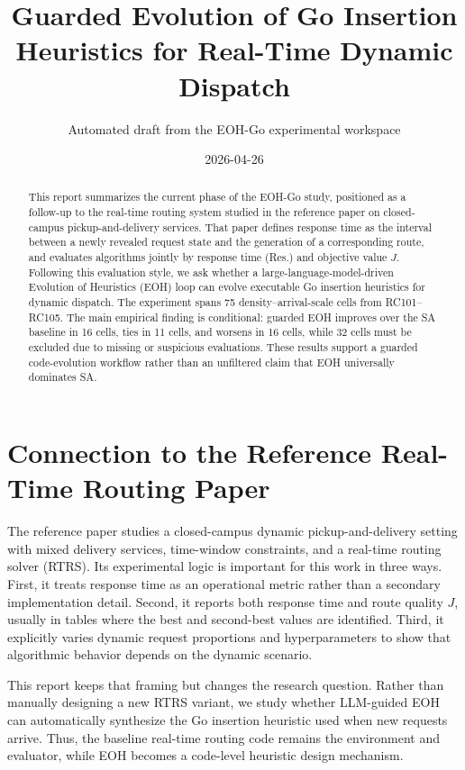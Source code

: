 \documentclass[11pt]{article}
\title{Guarded Evolution of Go Insertion Heuristics for Real-Time Dynamic Dispatch}
\author{Automated draft from the EOH-Go experimental workspace}
\date{2026-04-26}
\begin{document}
\maketitle

\begin{abstract}
This report summarizes the current phase of the EOH-Go study, positioned as a follow-up to the real-time routing system studied in the reference paper on closed-campus pickup-and-delivery services. That paper defines response time as the interval between a newly revealed request state and the generation of a corresponding route, and evaluates algorithms jointly by response time (Res.) and objective value \(J\). Following this evaluation style, we ask whether a large-language-model-driven Evolution of Heuristics (EOH) loop can evolve executable Go insertion heuristics for dynamic dispatch. The experiment spans 75 density--arrival-scale cells from RC101--RC105. The main empirical finding is conditional: guarded EOH improves over the SA baseline in 16 cells, ties in 11 cells, and worsens in 16 cells, while 32 cells must be excluded due to missing or suspicious evaluations. These results support a guarded code-evolution workflow rather than an unfiltered claim that EOH universally dominates SA.
\end{abstract}

\section{Connection to the Reference Real-Time Routing Paper}
The reference paper studies a closed-campus dynamic pickup-and-delivery setting with mixed delivery services, time-window constraints, and a real-time routing solver (RTRS). Its experimental logic is important for this work in three ways. First, it treats response time as an operational metric rather than a secondary implementation detail. Second, it reports both response time and route quality \(J\), usually in tables where the best and second-best values are identified. Third, it explicitly varies dynamic request proportions and hyperparameters to show that algorithmic behavior depends on the dynamic scenario.

This report keeps that framing but changes the research question. Rather than manually designing a new RTRS variant, we study whether LLM-guided EOH can automatically synthesize the Go insertion heuristic used when new requests arrive. Thus, the baseline real-time routing code remains the environment and evaluator, while EOH becomes a code-level heuristic design mechanism.
\end{document}
